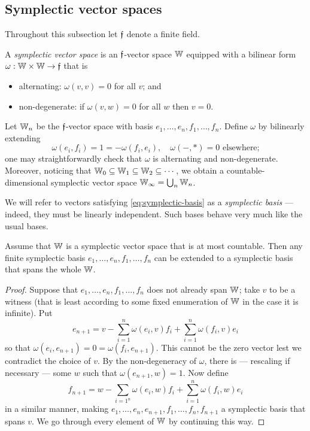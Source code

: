 \subsection{Symplectic vector spaces}
Throughout this subsection let $\mathfrak{f}$ denote a finite field.
\begin{definition}
    A \emph{symplectic vector space} is an $\mathfrak{f}$-vector space $\mathbb{W}$ 
    equipped with a bilinear form $\omega: \mathbb{W} \times \mathbb{W} \to \mathfrak{f}$ that is
    \begin{itemize}
        \item alternating: $\omega(v, v) = 0$ for all $v$; and
        \item non-degenerate: if $\omega(v, w) = 0$ for all $w$ then $v = 0$.
    \end{itemize}
\end{definition}

\begin{example}
    Let $\mathbb{W}_n$ be the $\mathfrak{f}$-vector space with basis $e_1  , \ldots, e_n, f_1, \ldots, f_n$.
    Define $\omega$ by bilinearly extending
    \begin{equation}\label{eq:symplectic-basis}
        \omega(e_i, f_i) = 1 = -\omega(f_i, e_i),\quad
        \omega(-, *) = 0 \text{ elsewhere;}
        \tag{\S}
    \end{equation}
    one may straightforwardly check that $\omega$ is alternating and non-degenerate.
    Moreover, noticing that $\mathbb{W}_0 \subseteq \mathbb{W}_1 \subseteq \mathbb{W}_2 \subseteq \cdots$,
    we obtain a countable-dimensional symplectic vector space $\mathbb{W}_\infty = \bigcup_n \mathbb{W}_n$.
\end{example}

We will refer to vectors satisfying \eqref{eq:symplectic-basis} as a \emph{symplectic basis} 
--- indeed, they must be linearly independent.
Such bases behave very much like the usual bases.

\begin{proposition}\label{prop:symplectic-basis}
    Assume that $\mathbb{W}$ is a symplectic vector space that is at most countable.
    Then any finite symplectic basis $e_1, \ldots, e_n, f_1, \ldots, f_n$ 
    can be extended to a symplectic basis that spans the whole $\mathbb{W}$.
\end{proposition}
\begin{proof}
    Suppose that $e_1, \ldots, e_n, f_1, \ldots, f_n$ does not already span $\mathbb{W}$;
    take $v$ to be a witness (that is least according to some fixed enumeration of $\mathbb{W}$ 
    in the case it is infinite).
    Put
    \[
        e_{n+1} = v - \sum_{i=1}^n \omega(e_i, v) f_i + \sum_{i=1}^n \omega(f_i, v) e_i
    \]
    so that $\omega(e_i, e_{n+1}) = 0 = \omega(f_i, e_{n+1})$.
    This cannot be the zero vector lest we contradict the choice of $v$.
    By the non-degeneracy of $\omega$, there is --- rescaling if necessary 
    --- some $w$ such that $\omega(e_{n+1}, w) = 1$. 
    Now define
    \[
        f_{n+1} = w - \sum_{i=1^n} \omega(e_i, w) f_i + \sum_{i=1}^n \omega(f_i, w) e_i
    \]
    in a similar manner, 
    making $e_1, \ldots, e_n, e_{n+1}, f_1, \ldots, f_n, f_{n+1}$ a symplectic basis that spans $v$.
    We go through every element of $\mathbb{W}$ by continuing this way.
\end{proof}


